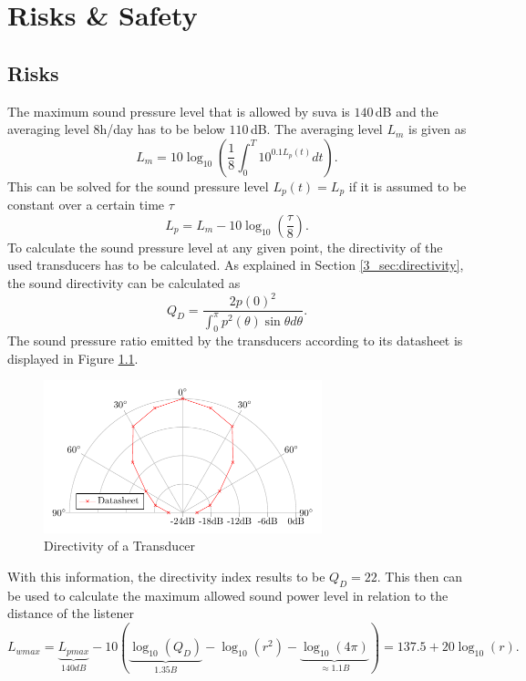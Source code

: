\chapter{Risks \& Safety}\label{5_chap:safety}
\section{Risks}
The maximum sound pressure level that is allowed by \acrshort{suva} is $140 \,$dB and the averaging level 8h/day has to be below $110 \,$dB. The averaging level $L_m$ is given as
\begin{equation}\label{5_Safety_eq:AveragingLevel}
    L_m = 10 \log_{10} \left (  \frac{1}{8} \int_0^T 10^{0.1 L_p(t)}dt\right ).
\end{equation}
This can be solved for the sound pressure level $L_p(t) = L_p$ if it is assumed to be constant over a certain time $\tau$
\begin{equation}\label{5_Safety_eq:AveragingLevel_SPL}
    L_p = L_m - 10\log_{10}\left ( \frac{\tau}{8} \right ).
\end{equation}
To calculate the sound pressure level at any given point, the directivity of the used transducers has to be calculated. As explained in Section \ref{3_sec:directivity}, the sound directivity can be calculated as
\begin{equation}\label{5_Safety_eq:Directivity}
    Q_D = \frac{2 p(0)^2}{\int_{0}^{\pi}p^2(\theta)\sin{\theta}d\theta}. 
\end{equation}
The sound pressure ratio emitted by the transducers according to its datasheet is displayed in Figure \ref{5_fig:directivity_transducer}.
\begin{figure}[h!]
    \centering
    \includegraphics[width=0.72\textwidth]{images/5_Safety_Risks/Polar_PlotDirectivity.pdf}
    \caption{Directivity of a Transducer}
    \label{5_fig:directivity_transducer}
\end{figure}
\newpage

With this information, the directivity index results to be $Q_D = 22$. This then can be used to calculate the maximum allowed sound power level in relation to the distance of the listener 
\begin{equation}
         L_{wmax} 
     = 
     \underbrace{L_{pmax}}_{140dB} - 10\left ( \underbrace{\log_{10}(Q_D)}_{1.35B} - \log_{10}(r^2) - \underbrace{\log_{10}(4\pi)}_{\approx 1.1B}  \right ) = 137.5 + 20\log_{10}(r).
     \label{5_eq:safety_max}
\end{equation}

